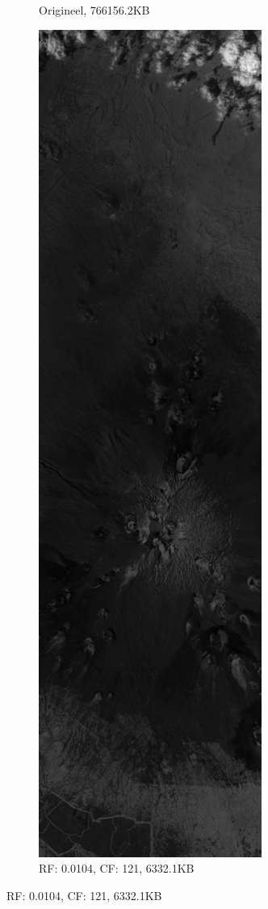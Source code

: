 \begin{figure}[]
\begin{subfigure}{0.48\textwidth}
  \caption{Origineel, 766156.2KB}
\end{subfigure}
\begin{subfigure}{0.48\textwidth}
  \centering
  \includegraphics[width=0.8\linewidth]{images/example_compression_Mauna_Kea_0_01.png}
  \caption{RF: 0.0104, CF: 121, 6332.1KB}
\end{subfigure}
\end{figure}
